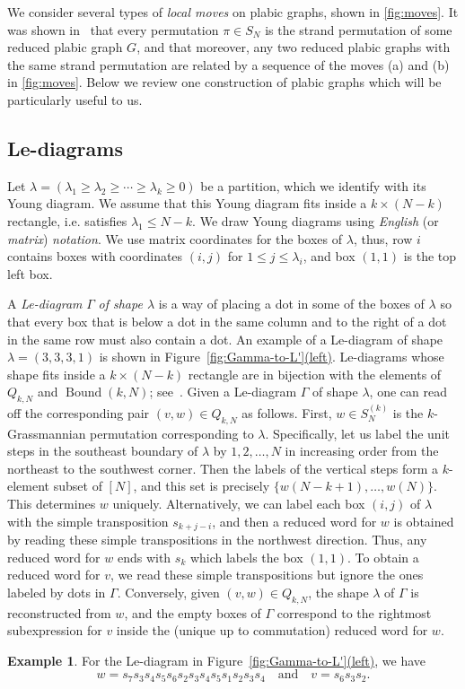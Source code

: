 \documentclass[11pt]{article}
\theoremstyle{definition}
\newtheorem{example}[theo]{Example}
\numberwithin{equation}{section}
\newcommand\Boundkn{\operatorname{Bound}(k,\n)}
\newcommand\Sn{S_\n}
\newcommand\Qkn{Q_{k,\n}}
\newcommand\Skn{S_\n^{(k)}}
\def\figref#1(#2){Figure~\hyperref[#1]{\ref*{#1}(#2)}}
\newcommand\n{N}
\newcommand{\la}{\lambda}
\begin{document}
We consider several types of \emph{local moves} on plabic graphs, shown in \cref{fig:moves}. 
%
 It was shown in~\cite{Pos} that every permutation $\pi\in\Sn$ is the strand permutation of some reduced plabic graph $G$, and that moreover, any two reduced plabic graphs with the same strand permutation are related by a sequence of the moves (a) and (b) in \cref{fig:moves}. Below we review one construction of plabic graphs which will be particularly useful to us.

\subsection{Le-diagrams}\label{sec:Le-diags}
Let $\la=(\la_1\geq\la_2\geq\cdots\geq\la_k\geq0)$ be a partition, which we identify with its Young diagram. We assume that this Young diagram fits inside a $k\times (\n-k)$ rectangle, i.e.  satisfies $\la_1\leq \n-k$. We draw Young diagrams using \emph{English} (or \emph{matrix}) \emph{notation}. We use matrix coordinates for the boxes of $\la$, thus, row $i$ contains boxes with coordinates $(i,j)$ for $1\leq j\leq \la_i$, and box $(1,1)$ is the top left box.

A \emph{Le-diagram} $\Gamma$ \emph{of shape $\la$} is a way of placing a dot in some of the boxes of $\la$ so that every box that is below a dot in the same column and to the right of a dot in the same row must also contain a dot.  
%
 An example of a Le-diagram of shape $\la=(3,3,3,1)$ is shown in \figref{fig:Gamma-to-L'}(left). Le-diagrams whose shape fits inside a $k\times(\n-k)$ rectangle are in bijection with the elements of $\Qkn$ and $\Boundkn$; see~\cite[Section~19]{Pos}. Given a Le-diagram $\Gamma$ of shape $\la$, one can read off the corresponding pair $(v,w)\in\Qkn$ as follows. First, $w\in\Skn$ is the $k$-Grassmannian permutation corresponding to $\la$. Specifically, let us label the unit steps in the southeast boundary of $\la$ by $1,2,\dots,\n$ in increasing order from the northeast to the southwest corner. Then the labels of the vertical steps form a $k$-element subset of $[\n]$, and this set is precisely $\{w(\n-k+1),\dots,w(\n)\}$. This determines $w$ uniquely. Alternatively, we can label each box $(i,j)$ of $\la$ with the simple transposition $s_{k+j-i}$, and then a reduced word for $w$ is obtained by reading these simple transpositions in the northwest direction. Thus, any reduced word for $w$ ends with $s_k$ which labels the box $(1,1)$. To obtain a reduced word for $v$, we read these simple transpositions but ignore the ones labeled by dots in $\Gamma$. Conversely, given $(v,w)\in\Qkn$, the shape $\la$ of $\Gamma$ is reconstructed from $w$, and the empty boxes of $\Gamma$ correspond to the rightmost subexpression for $v$ inside the (unique up to commutation) reduced word for $w$.
\begin{example}
For the Le-diagram in \figref{fig:Gamma-to-L'}(left), we have 
\begin{equation*}%
w= s_7 s_3 s_4 s_5 s_6 s_2 s_3 s_4 s_5 s_1 s_2 s_3 s_4
\quad\text{and}\quad
v= s_6 s_3 s_2.
\end{equation*}
\end{example}
\end{document}
